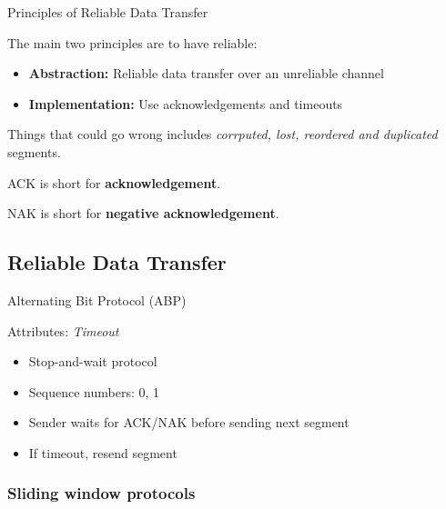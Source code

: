 \begin{definition}
    {Principles of Reliable Data Transfer}

    The main two principles are to have reliable:
    \begin{itemize}
        \item \textbf{Abstraction:} Reliable data transfer over an unreliable channel
        \item \textbf{Implementation:} Use acknowledgements and timeouts
    \end{itemize}

    Things that could go wrong includes \textit{corrputed, lost, reordered and duplicated} segments.
\end{definition}

ACK is short for \textbf{acknowledgement}.

NAK is short for \textbf{negative acknowledgement}.

\subsection{Reliable Data Transfer}

\begin{theorem}
    {Alternating Bit Protocol (ABP)}

    Attributes: \textit{Timeout}

    \begin{itemize}
        \item Stop-and-wait protocol
        \item Sequence numbers: 0, 1
        \item Sender waits for ACK/NAK before sending next segment
        \item If timeout, resend segment
    \end{itemize}
\end{theorem}


\subsubsection{Sliding window protocols}

